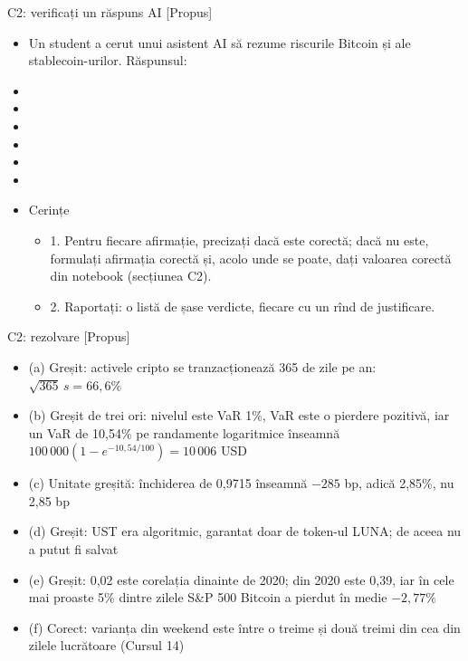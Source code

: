 \begin{frame}{C2: verificați un răspuns AI [Propus]}
\itemsize{\scriptsize}
\begin{itemize}
    \item Un student a cerut unui asistent AI să rezume riscurile Bitcoin și ale stablecoin-urilor. Răspunsul:
    \item {}
    \item {}
    \item {}
    \item {}
    \item {}
    \item {}
    \item Cerințe
    \begin{itemize}
        \item 1. Pentru fiecare afirmație, precizați dacă este corectă; dacă nu este, formulați afirmația corectă și, acolo unde se poate, dați valoarea corectă din notebook (secțiunea C2).
        \item 2. Raportați: o listă de șase verdicte, fiecare cu un rînd de justificare.
    \end{itemize}
\end{itemize}
\end{frame}

\ifsolutions
\begin{frame}{C2: rezolvare [Propus]}
\itemsize{\footnotesize}
\begin{itemize}
    \item (a) Greșit: activele cripto se tranzacționează 365 de zile pe an: $\sqrt{365}\,s = 66{,}6\%$
    \item (b) Greșit de trei ori: nivelul este VaR 1\%, VaR este o pierdere pozitivă, iar un VaR de 10{,}54\% pe randamente logaritmice înseamnă $100\,000(1 - e^{-10{,}54/100}) = 10\,006$ USD
    \item (c) Unitate greșită: închiderea de 0,9715 înseamnă $-285$ bp, adică 2,85\%, nu 2,85 bp
    \item (d) Greșit: UST era algoritmic, garantat doar de token-ul LUNA; de aceea nu a putut fi salvat
    \item (e) Greșit: 0{,}02 este corelația dinainte de 2020; din 2020 este 0{,}39, iar în cele mai proaste 5\% dintre zilele S\&P 500 Bitcoin a pierdut în medie $-2{,}77\%$
    \item (f) Corect: varianța din weekend este între o treime și două treimi din cea din zilele lucrătoare (Cursul 14)
\end{itemize}
\end{frame}
\fi


